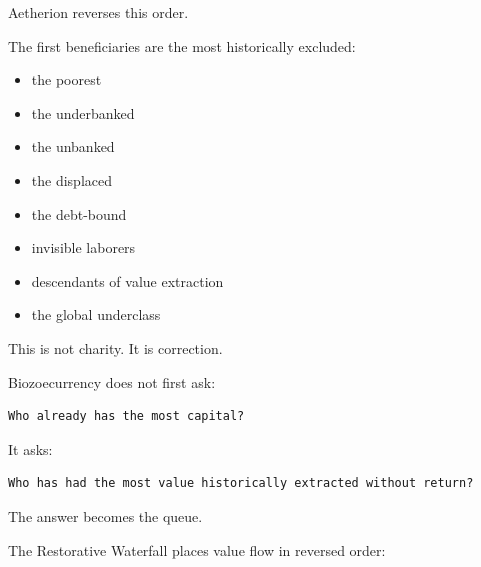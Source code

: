 ﻿\documentclass[12pt]{article}
\begin{document}
Aetherion reverses this order.

The first beneficiaries are the most historically excluded:

\begin{itemize}
  \item the poorest
\end{itemize}
\begin{itemize}
  \item the underbanked
\end{itemize}
\begin{itemize}
  \item the unbanked
\end{itemize}
\begin{itemize}
  \item the displaced
\end{itemize}
\begin{itemize}
  \item the debt-bound
\end{itemize}
\begin{itemize}
  \item invisible laborers
\end{itemize}
\begin{itemize}
  \item descendants of value extraction
\end{itemize}
\begin{itemize}
  \item the global underclass
\end{itemize}

This is not charity. It is correction.

Biozoecurrency does not first ask:

\begin{verbatim}
Who already has the most capital?
\end{verbatim}

It asks:

\begin{verbatim}
Who has had the most value historically extracted without return?
\end{verbatim}

The answer becomes the queue.

The Restorative Waterfall places value flow in reversed order:
\end{document}
